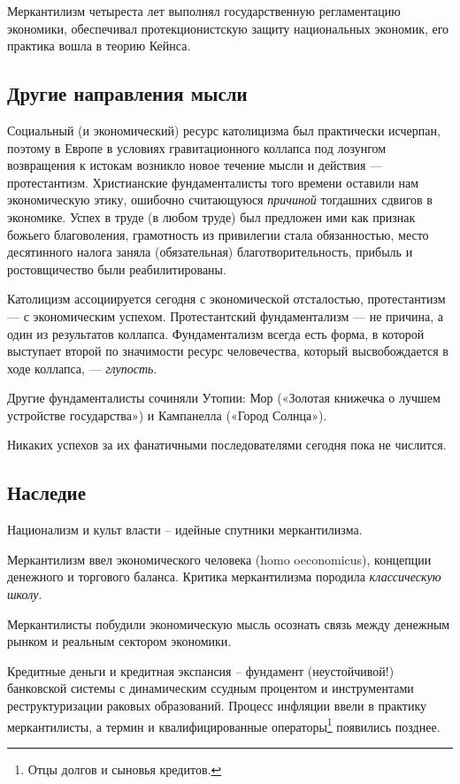 Меркантилизм четыреста лет выполнял государственную регламентацию экономики, обеспечивал протекционистскую защиту
национальных экономик, его практика вошла в теорию Кейнса.

\subsection[Другие направления мысли]{Другие направления мысли}
Социальный (и экономический) ресурс католицизма был практически исчерпан, поэтому в Европе в условиях гравитационного
коллапса под лозунгом возвращения к истокам возникло новое течение мысли и действия — протестантизм. Христианские
фундаменталисты того времени оставили нам экономическую этику, ошибочно считающуюся \textit{причиной} тогдашних сдвигов
в экономике. Успех в труде (в любом труде) был предложен ими как признак божьего благоволения, грамотность из
привилегии стала обязанностью, место десятинного налога заняла (обязательная) благотворительность, прибыль и
ростовщичество были реабилитированы.

Католицизм ассоциируется сегодня с экономической отсталостью, протестантизм — с экономическим успехом. Протестантский
фундаментализм — не причина, а один из результатов коллапса. Фундаментализм всегда есть форма, в которой выступает
второй по значимости ресурс человечества, который высвобождается в ходе коллапса, — \textit{глупость}.

Другие фундаменталисты сочиняли Утопии: Мор («Золотая книжечка о лучшем устройстве государства») и Кампанелла («Город
Солнца»).

Никаких успехов за их фанатичными последователями сегодня пока не числится.

\subsection[Наследие]{Наследие}
Национализм и культ власти – идейные спутники меркантилизма.

Меркантилизм ввел экономического человека (homo oeconomicus), концепции денежного и торгового баланса. Критика
меркантилизма породила \textit{классическую школу}.

Меркантилисты побудили экономическую мысль осознать связь между денежным рынком и реальным сектором экономики.

Кредитные деньги и кредитная экспансия – фундамент (неустойчивой!) банковской системы с динамическим ссудным процентом и
инструментами реструктуризации раковых образований. Процесс инфляции ввели в практику меркантилисты, а термин и
квалифицированные операторы\footnote{Отцы долгов и сыновья кредитов.} появились позднее.

